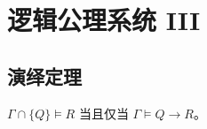 \section{逻辑公理系统 III}

\subsection{演绎定理}

\begin{theorem}[演绎定理]
	$\Gamma \cap \{Q\} \models R$ 当且仅当 $\Gamma \models Q \to R$。
\end{theorem}
